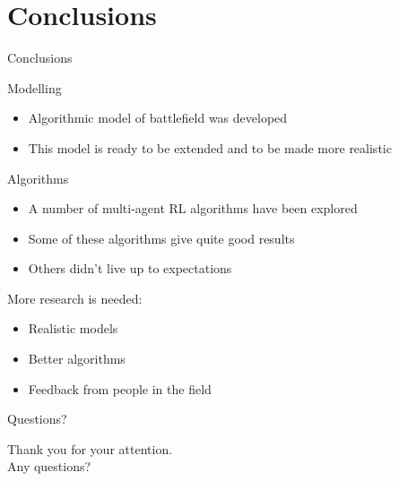 \documentclass{beamer}
\begin{document}
\section{Conclusions}
\begin{frame}{Conclusions}
\begin{block}{Modelling}
\begin{itemize}
    \item Algorithmic model of battlefield was developed
    \item This model is ready to be extended and to be made more realistic
\end{itemize}
\pause
\end{block}
\begin{block}{Algorithms}
\begin{itemize}
    \item A number of multi-agent RL algorithms have been explored
    \item Some of these algorithms give quite good results
    \item Others didn't live up to expectations
\end{itemize}
\end{block}
\pause
More research is needed:
\begin{itemize}
    \item Realistic models
    \item Better algorithms
    \item Feedback from people in the field
\end{itemize}
\end{frame}

\begin{frame}{Questions?}
\begin{center}
Thank you for your attention.\\
\Huge Any questions?
\end{center}
\end{frame}
\end{document}
